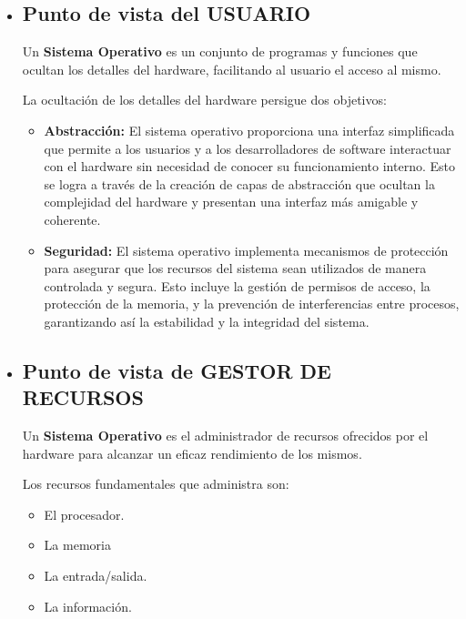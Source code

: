 \begin{itemize}
	\item  \subsection{Punto de vista del USUARIO}
		\begin{tcolorbox}
			Un \textbf{Sistema Operativo }es un conjunto de programas y funciones que ocultan los detalles del hardware\cite{introsistema}, facilitando al usuario el acceso al mismo. 
	\end{tcolorbox}
	La ocultación de los detalles del hardware persigue dos objetivos:
	    \begin{itemize}
			\item \textbf{Abstracción:} El sistema operativo proporciona una interfaz simplificada que permite a los usuarios y a los desarrolladores de software interactuar con el hardware sin necesidad de conocer su funcionamiento interno. Esto se logra a través de la creación de capas de abstracción que ocultan la complejidad del hardware y presentan una interfaz más amigable y coherente.
			\item \textbf{Seguridad:} El sistema operativo implementa mecanismos de protección para asegurar que los recursos del sistema sean utilizados de manera controlada y segura. Esto incluye la gestión de permisos de acceso, la protección de la memoria, y la prevención de interferencias entre procesos, garantizando así la estabilidad y la integridad del sistema.
		\end{itemize}
	\item \subsection{Punto de vista de GESTOR DE RECURSOS}
	
		\begin{tcolorbox}
			Un \textbf{Sistema Operativo }es el administrador de recursos ofrecidos por el hardware para alcanzar un eficaz rendimiento de los mismos\cite{introsistema}.
		\end{tcolorbox}

	Los recursos fundamentales que administra son:
	
		\begin{itemize}
			\item El procesador.
			\item La memoria
			\item La entrada/salida.
			\item La información.
		\end{itemize}

	
\end{itemize}

